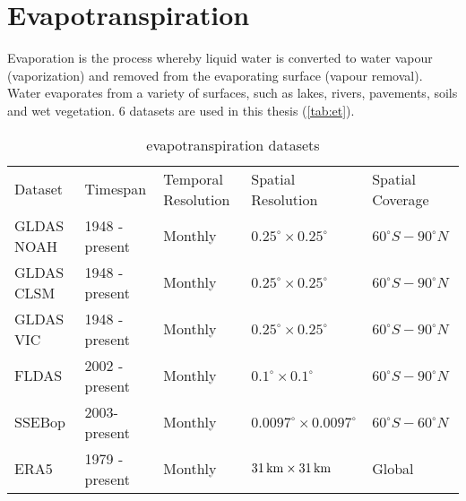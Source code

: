 \section{Evapotranspiration}
Evaporation is the process whereby liquid water is converted to water vapour (vaporization) and removed from the evaporating surface (vapour removal). Water evaporates from a variety of surfaces, such as lakes, rivers, pavements, soils and wet vegetation. 6 datasets are used in this thesis (\autoref{tab:et}). 
\begin{table}[htbp]\centering 
	\begin{tabular}{lllll}
		&                                     &                                          &                                         &                                       \\ \hline
		\multicolumn{1}{|l|}{Dataset}    & \multicolumn{1}{l|}{Timespan}       & \multicolumn{1}{l|}{Temporal Resolution} & \multicolumn{1}{l|}{Spatial Resolution} & \multicolumn{1}{l|}{Spatial Coverage} \\ \hline
		\multicolumn{1}{|l|}{GLDAS NOAH} & \multicolumn{1}{l|}{1948 - present} & \multicolumn{1}{l|}{Monthly}             & \multicolumn{1}{l|}{$0.25^{\circ} \times  0.25^{\circ}$}        & \multicolumn{1}{l|}{$60^{\circ}S - 90^{\circ}N$}      \\ \hline
		\multicolumn{1}{|l|}{GLDAS CLSM} & \multicolumn{1}{l|}{1948 - present} & \multicolumn{1}{l|}{Monthly}             & \multicolumn{1}{l|}{$0.25^{\circ} \times 0.25^{\circ}$}        & \multicolumn{1}{l|}{$60^{\circ}S - 90^{\circ}N$}      \\ \hline
		\multicolumn{1}{|l|}{GLDAS VIC}  & \multicolumn{1}{l|}{1948 - present} & \multicolumn{1}{l|}{Monthly}             & \multicolumn{1}{l|}{$0.25^{\circ} \times 0.25^{\circ}$}        & \multicolumn{1}{l|}{$60^{\circ}S - 90^{\circ}N$}      \\ \hline
		\multicolumn{1}{|l|}{FLDAS}      & \multicolumn{1}{l|}{2002 - present} & \multicolumn{1}{l|}{Monthly}             & \multicolumn{1}{l|}{$0.1^{\circ} \times 0.1^{\circ}$}          & \multicolumn{1}{l|}{$60^{\circ}S - 90^{\circ}N$}      \\ \hline
		\multicolumn{1}{|l|}{SSEBop}     & \multicolumn{1}{l|}{2003- present}  & \multicolumn{1}{l|}{Monthly}             & \multicolumn{1}{l|}{$0.0097^{\circ} \times 0.0097^{\circ}$}    & \multicolumn{1}{l|}{$60^{\circ}S - 60^{\circ}N$}      \\ \hline
		\multicolumn{1}{|l|}{ERA5}       & \multicolumn{1}{l|}{1979 - present} & \multicolumn{1}{l|}{Monthly}             & \multicolumn{1}{l|}{$31\,\mathrm{km} \times 31\,\mathrm{km}$}            & \multicolumn{1}{l|}{Global}           \\ \hline
	\end{tabular}
	\caption{evapotranspiration datasets}
	\label{tab:et}
\end{table}
